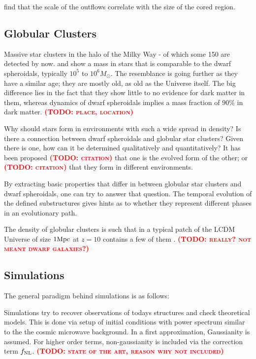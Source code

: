 \documentclass[useAMS,usenatbib]{mn2e}
\newcommand{\TODO}[1]{\textsc{\textbf{\textcolor{red}{(TODO: #1)}}}}
\begin{document}
\cite{Teyssier+2013} find that the scale of the outflows correlate
with the size of the cored region.

\subsection{Globular Clusters}
Massive star clusters in the halo of the Milky Way - of which some 150
are detected by now. \citep{Zinn1985} and \citep{DeAngeli2005} show a
mass in stars that is comparable to the dwarf spheroidals, typically
$10^5$ to $10^6M_\odot$. The resemblance is going further as they have
a similar age; they are mostly old, as old as the Universe itself. The
big difference lies in the fact that they show little to no evidence
for dark matter in them, whereas dynamics of dwarf spheroidals implies
a mass fraction of $90\%$ in dark matter. \TODO{place, location}

Why should stars form in environments with such a wide spread in
density? Is there a connection between dwarf spheroidals and globular
star clusters? Given there is one, how can it be determined
qualitatively and quantitatively? It has been proposed \TODO{citation}
that one is the evolved form of the other; or \TODO{citation} that they
form in different environments.

By extracting basic properties that differ in between globular star
clusters and dwarf spheroidals, one can try to answer that
question. The temporal evolution of the defined substructures gives
hints as to whether they represent different phases in an evolutionary
path.

The density of globular clusters is such that in a typical patch of
the LCDM Universe of size $1\rm Mpc$ at $z=10$ contains a few of them
\citep{Boley2009}. \TODO{really? not meant dwarf galaxies?}

\subsection{Simulations}
The general paradigm behind simulations is as follows:

Simulations try to recover observations of todays structures and check
theoretical models. This is done via setup of initial conditions with
power spectrum similar to the the cosmic microwave background. In a
first approximation, Gaussianity is assumed. For higher order terms,
non-gaussianity is included via the correction term $f_{\rm NL}$.
\TODO{state of the art, reason why not included}
\end{document}

